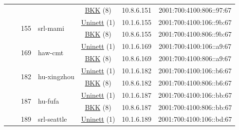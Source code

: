 \begin{small}
\begin{center}
\begin{longtable}{|c|c|c|c|c|c|c|c|}
  &  &  &  & \multicolumn{2}{|c|}{\tiny{\href{http://bkk.no}{BKK} (8)}} & \tiny{10.8.6.151} & \tiny{2001:700:4100:806::97:67} \\* \cline{3-3}\cline{4-4}\cline{5-5}\cline{6-6}\cline{7-7}\cline{8-8}
  &  & \multirow{2}{*}{\tiny{155}} & \multicolumn{1}{|l|}{\multirow{2}{*}{\tiny{srl-mami}}} & \multicolumn{2}{|c|}{\tiny{\href{https://www.uninett.no}{Uninett} (1)}} & \tiny{10.1.6.155} & \tiny{2001:700:4100:106::9b:67} \\* \cline{5-5}\cline{6-6}\cline{7-7}\cline{8-8}
  &  &  &  & \multicolumn{2}{|c|}{\tiny{\href{http://bkk.no}{BKK} (8)}} & \tiny{10.8.6.155} & \tiny{2001:700:4100:806::9b:67} \\* \cline{3-3}\cline{4-4}\cline{5-5}\cline{6-6}\cline{7-7}\cline{8-8}
  &  & \multirow{2}{*}{\tiny{169}} & \multicolumn{1}{|l|}{\multirow{2}{*}{\tiny{haw-cmt}}} & \multicolumn{2}{|c|}{\tiny{\href{https://www.uninett.no}{Uninett} (1)}} & \tiny{10.1.6.169} & \tiny{2001:700:4100:106::a9:67} \\* \cline{5-5}\cline{6-6}\cline{7-7}\cline{8-8}
  &  &  &  & \multicolumn{2}{|c|}{\tiny{\href{http://bkk.no}{BKK} (8)}} & \tiny{10.8.6.169} & \tiny{2001:700:4100:806::a9:67} \\* \cline{3-3}\cline{4-4}\cline{5-5}\cline{6-6}\cline{7-7}\cline{8-8}
  &  & \multirow{2}{*}{\tiny{182}} & \multicolumn{1}{|l|}{\multirow{2}{*}{\tiny{hu-xingzhou}}} & \multicolumn{2}{|c|}{\tiny{\href{https://www.uninett.no}{Uninett} (1)}} & \tiny{10.1.6.182} & \tiny{2001:700:4100:106::b6:67} \\* \cline{5-5}\cline{6-6}\cline{7-7}\cline{8-8}
  &  &  &  & \multicolumn{2}{|c|}{\tiny{\href{http://bkk.no}{BKK} (8)}} & \tiny{10.8.6.182} & \tiny{2001:700:4100:806::b6:67} \\* \cline{3-3}\cline{4-4}\cline{5-5}\cline{6-6}\cline{7-7}\cline{8-8}
  &  & \multirow{2}{*}{\tiny{187}} & \multicolumn{1}{|l|}{\multirow{2}{*}{\tiny{hu-fufa}}} & \multicolumn{2}{|c|}{\tiny{\href{https://www.uninett.no}{Uninett} (1)}} & \tiny{10.1.6.187} & \tiny{2001:700:4100:106::bb:67} \\* \cline{5-5}\cline{6-6}\cline{7-7}\cline{8-8}
  &  &  &  & \multicolumn{2}{|c|}{\tiny{\href{http://bkk.no}{BKK} (8)}} & \tiny{10.8.6.187} & \tiny{2001:700:4100:806::bb:67} \\* \cline{3-3}\cline{4-4}\cline{5-5}\cline{6-6}\cline{7-7}\cline{8-8}
  &  & \multirow{2}{*}{\tiny{189}} & \multicolumn{1}{|l|}{\multirow{2}{*}{\tiny{srl-seattle}}} & \multicolumn{2}{|c|}{\tiny{\href{https://www.uninett.no}{Uninett} (1)}} & \tiny{10.1.6.189} & \tiny{2001:700:4100:106::bd:67} \\* \cline{5-5}\cline{6-6}\cline{7-7}\cline{8-8}

\end{longtable}
\end{center}
\end{small}
